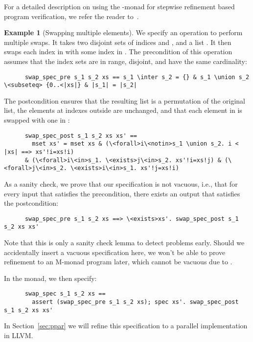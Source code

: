 \documentclass[sn-mathphys,Numbered]{sn-jnl}
\theoremstyle{thmstyleone}%
\theoremstyle{definition}%
\newtheorem{example}{Example}%
\theoremstyle{thmstylethree}%
\begin{document}
  For a detailed description on using the -monad for stepwise refinement based program verification, we refer the reader to~\cite{LaTu12}.

  \begin{example}[Swapping multiple elements]\label{ex:swap_spec}
    We specify an operation to perform multiple swaps. It takes two disjoint sets of indices  and , and a list . It then swaps each index in  with some index in .
    The precondition of this operation assumes that the index sets are in range, disjoint, and have the same cardinality:
    \begin{lstlisting}
      swap_spec_pre s_1 s_2 xs == s_1 \inter s_2 = {} & s_1 \union s_2 \<subseteq> {0..<|xs|} & |s_1| = |s_2|
    \end{lstlisting}
    The postcondition ensures that the resulting list is a permutation of the original list,
    the elements at indexes outside  are unchanged, and that each element in  is swapped with one in :
    \begin{lstlisting}
      swap_spec_post s_1 s_2 xs xs' ==
        mset xs' = mset xs & (\<forall>i\<notin>s_1 \union s_2. i < |xs| ==> xs'!i=xs!i)
      & (\<forall>i\<in>s_1. \<exists>j\<in>s_2. xs'!i=xs!j) & (\<forall>j\<in>s_2. \<exists>i\<in>s_1. xs'!j=xs!i)
    \end{lstlisting}

    As a sanity check, we prove that our specification is not vacuous, i.e., that for every input that satisfies the precondition, there
    exists an output that satisfies the postcondition:
    \begin{lstlisting}
      swap_spec_pre s_1 s_2 xs ==> \<exists>xs'. swap_spec_post s_1 s_2 xs xs'
    \end{lstlisting}
    Note that this is only a sanity check lemma to detect problems early.
    Should we accidentally insert a vacuous specification here, we won't be able to prove refinement to an M-monad program later, which cannot be vacuous due to .

    In the  monad, we then specify:
    \begin{lstlisting}
      swap_spec s_1 s_2 xs ==
        assert (swap_spec_pre s_1 s_2 xs); spec xs'. swap_spec_post s_1 s_2 xs xs'
    \end{lstlisting}
%
    In Section~\ref{sec:ppar} we will refine this specification to a parallel implementation in LLVM.
  \end{example}
\end{document}
